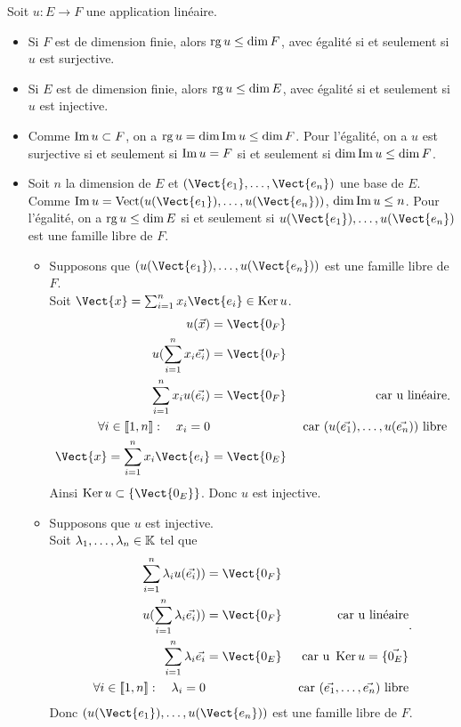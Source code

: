 \documentclass{book}
\begin{document}
\begin{Proposition}
Soit $u:E\to F$ une application linéaire.
\begin{itemize}
\item Si $F$ est de dimension finie, alors $\operatorname{rg} u \leq \dim F$, avec égalité si et seulement si $u$ est surjective.
\item  Si $E$ est de dimension finie, alors $\operatorname{rg} u \leq \dim E$, avec égalité si et seulement si $u$ est injective.
\end{itemize}
\end{Proposition}
\begin{Demonstration}
\begin{itemize}
\item 
Comme $\operatorname{Im} u \subset F$, on a $\operatorname{rg} u =\dim  \operatorname{Im} u\leq \dim F$. Pour l'égalité, on a  $u$ est surjective si et seulement si  $\operatorname{Im} u =  F$ si et seulement si $\dim  \operatorname{Im} u\leq \dim F$.
\item Soit $n$ la dimension de $E$ et $(\Vect{e_1},\dots,\Vect{e_n})$ une base de $E$. Comme $\im u=\operatorname{Vect}(u(\Vect{e_1}),\dots,u(\Vect{e_n}))$, $\dim  \operatorname{Im} u\leq n$. Pour l'égalité, on a $\operatorname{rg} u \leq \dim E$ si et seulement si $u(\Vect{e_1}),\dots,u(\Vect{e_n})$ est une famille libre de $F$. 
\begin{itemize}
\item 
Supposons que $(u(\Vect{e_1}),\dots,u(\Vect{e_n}))$ est une famille libre de $F$. \\
Soit $\Vect{x}=\sum_{i=1}^n x_i\Vect{e_i} \in \Ker u$.
$$
\begin{aligned}
u(\vec{x})&=\Vect{0_F}&\\
u(\sum_{i=1}^n x_i\vec{e_i})&=\Vect{0_F}&\\
\sum_{i=1}^n x_i u(\vec{e_i})&=\Vect{0_F}&\text{ car u  linéaire}\\
\forall i\in \Intf{1}{n}:\quad x_i=0 &&\text{ car }  (u(\vec{e_1}),\dots,u(\vec{e_n})) \text{ libre}\\
\Vect{x}=\sum_{i=1}^n x_i\Vect{e_i}&=\Vect{0_E}&
\end{aligned}.
$$ Ainsi $\Ker u\subset \{\Vect{0_E}\}$. Donc $u$ est injective.
\item Supposons que $u$ est injective.\\
Soit $\lambda_1,\dots,\lambda_n\in\mathbb{K}$ tel que 
$$
\begin{aligned}
\sum_{i=1}^n\lambda_i u(\vec{e_i}))&=\Vect{0_F}&\\
u(\sum_{i=1}^n\lambda_i \vec{e_i}))&=\Vect{0_F}&\text{ car u  linéaire}\\
\sum_{i=1}^n\lambda_i \vec{e_i} &=\Vect{0_E}&\text{ car u  }\Ker u= \{\vec{0_E}\}\\
\forall i\in \Intf{1}{n}:\quad \lambda_i=0 &&\text{ car }  (\vec{e_1},\dots,\vec{e_n}) \text{ libre}\\
\end{aligned}.
$$
Donc $(u(\Vect{e_1}),\dots,u(\Vect{e_n}))$ est une famille libre de $F$.
\end{itemize}
\end{itemize}
\end{Demonstration}
\end{document}

